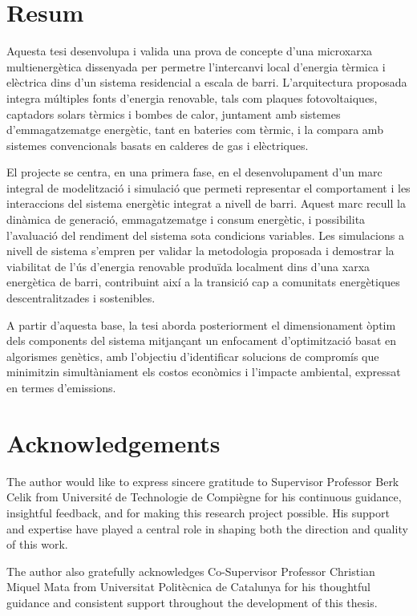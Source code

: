 \documentclass[12pt,a4paper]{report}
\begin{document}
\chapter*{Resum}
\noindent Aquesta tesi desenvolupa i valida una prova de concepte d'una microxarxa multienergètica dissenyada per permetre l'intercanvi local d'energia tèrmica i elèctrica dins d'un sistema residencial a escala de barri. L'arquitectura proposada integra múltiples fonts d'energia renovable, tals com plaques fotovoltaiques, captadors solars tèrmics i bombes de calor, juntament amb sistemes d'emmagatzematge energètic, tant en bateries com tèrmic, i la compara amb sistemes convencionals basats en calderes de gas i elèctriques.

El projecte se centra, en una primera fase, en el desenvolupament d'un marc integral de modelització i simulació que permeti representar el comportament i les interaccions del sistema energètic integrat a nivell de barri. Aquest marc recull la dinàmica de generació, emmagatzematge i consum energètic, i possibilita l'avaluació del rendiment del sistema sota condicions variables. Les simulacions a nivell de sistema s'empren per validar la metodologia proposada i demostrar la viabilitat de l'ús d'energia renovable produïda localment dins d'una xarxa energètica de barri, contribuint així a la transició cap a comunitats energètiques descentralitzades i sostenibles.

A partir d'aquesta base, la tesi aborda posteriorment el dimensionament òptim dels components del sistema mitjançant un enfocament d'optimització basat en algorismes genètics, amb l'objectiu d'identificar solucions de compromís que minimitzin simultàniament els costos econòmics i l'impacte ambiental, expressat en termes d'emissions.

\chapter*{Acknowledgements}
\noindent The author would like to express sincere gratitude to Supervisor Professor Berk Celik from Université de Technologie de Compiègne for his continuous guidance, insightful feedback, and for making this research project possible. His support and expertise have played a central role in shaping both the direction and quality of this work.

The author also gratefully acknowledges Co-Supervisor Professor Christian Miquel Mata from Universitat Politècnica de Catalunya for his thoughtful guidance and consistent support throughout the development of this thesis.
\end{document}
